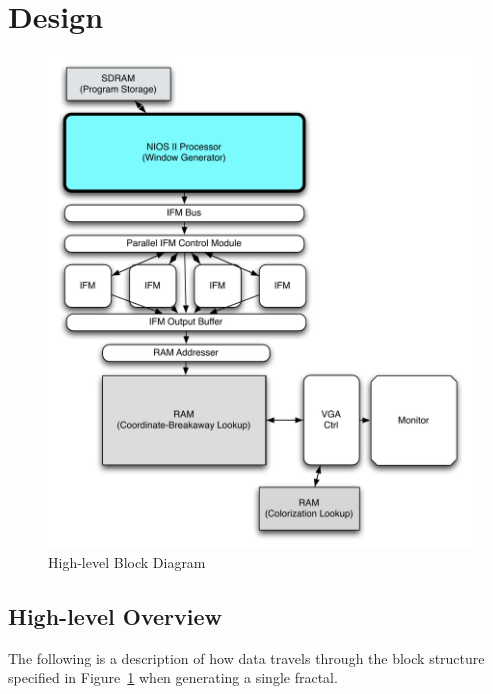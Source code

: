 \documentclass{article}
\begin{document}
\section{Design}

\begin{figure}\label{fig:block}
  \centering
	\includegraphics[width=\textwidth]{block_diagrams/top_level.pdf}
  \caption{High-level Block Diagram}
\end{figure}

\subsection{High-level Overview}

The following is a description of how data travels through the block structure specified in Figure~\ref{fig:block} when generating a single fractal.
\end{document}
